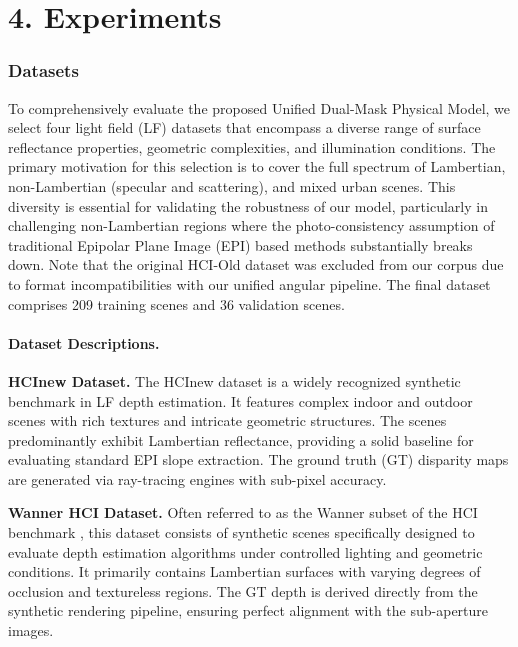 \documentclass[lettersize,journal]{IEEEtran}
\begin{document}
\section{4. Experiments}

\subsubsection{Datasets}

To comprehensively evaluate the proposed Unified Dual-Mask Physical Model, we select four light field (LF) datasets that encompass a diverse range of surface reflectance properties, geometric complexities, and illumination conditions. The primary motivation for this selection is to cover the full spectrum of Lambertian, non-Lambertian (specular and scattering), and mixed urban scenes. This diversity is essential for validating the robustness of our model, particularly in challenging non-Lambertian regions where the photo-consistency assumption of traditional Epipolar Plane Image (EPI) based methods substantially breaks down. Note that the original HCI-Old dataset was excluded from our corpus due to format incompatibilities with our unified angular pipeline. The final dataset comprises 209 training scenes and 36 validation scenes.

\paragraph{Dataset Descriptions.}

\textbf{HCInew Dataset.} The HCInew dataset \cite{lightlight} is a widely recognized synthetic benchmark in LF depth estimation. It features complex indoor and outdoor scenes with rich textures and intricate geometric structures. The scenes predominantly exhibit Lambertian reflectance, providing a solid baseline for evaluating standard EPI slope extraction. The ground truth (GT) disparity maps are generated via ray-tracing engines with sub-pixel accuracy. 

\textbf{Wanner HCI Dataset.} Often referred to as the Wanner subset of the HCI benchmark \cite{autonomous}, this dataset consists of synthetic scenes specifically designed to evaluate depth estimation algorithms under controlled lighting and geometric conditions. It primarily contains Lambertian surfaces with varying degrees of occlusion and textureless regions. The GT depth is derived directly from the synthetic rendering pipeline, ensuring perfect alignment with the sub-aperture images.
\end{document}
